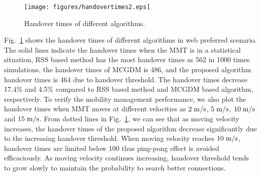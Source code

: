 \documentclass[conference]{IEEEtran}
\begin{document}
\begin{figure}[htbp!]
	\centering
	\texttt{[image: figures/handovertimes2.eps]}
	\caption{Handover times of different algorithms. }\label{fig:handovernumber}
	\vspace{-1em}
\end{figure}
Fig.~\ref{fig:handovernumber} shows the handover times of different algorithms in web preferred scenario.
The solid lines indicate the handover times when the MMT is in a statistical situation, RSS based method has the most handover times as 562 in 1000 times simulations, the handover times of MCGDM is 486, and 
the proposed algorithm handover times is 464 
 due to handover threshold. 
The handover times decrease 17.4\% and 4.5\% compared to RSS based method and MCGDM based algorithm, respectively.
To verify the mobility  management performance,		%
 we also plot the handover times when MMT moves at different velocities as $2\;\rm m/s$,  $5\;\rm m/s$, $10 \; \rm m/s$ and $15\; \rm m/s$.
From dotted lines in Fig.~\ref{fig:handovernumber}, we can see that as moving velocity increases, the handover times of the proposed algorithm decrease significantly due to the increasing handover threshold. 
When moving velocity reaches $10\;\rm m/s$, handover times are limited below 100 thus ping-pong effect is avoided efficaciously.
As moving velocity continues increasing, handover threshold tends to grow slowly to maintain the probability to search better connections.
 

\begin{comment}[htbp!]
	\centering
	\texttt{[image: figures/netscore3.eps]}
	\caption{Network utility score versus simulation times.}\label{fig:netu}
	\vspace{-1em}
\end{comment}

\end{document}
